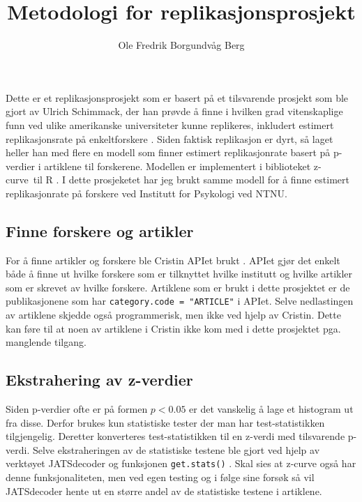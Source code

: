 \documentclass[doc,norsk]{apa7}
\title{Metodologi for replikasjonsprosjekt}
\author{Ole Fredrik Borgundvåg Berg}
\affiliation{NTNU}
\begin{document}
\maketitle

Dette er et replikasjonsprosjekt som er basert på et tilsvarende prosjekt som ble gjort av Ulrich Schimmack, der han prøvde å finne i hvilken grad vitenskaplige funn ved ulike amerikanske universiteter kunne replikeres, inkludert estimert replikasjonsrate på enkeltforskere \parencite{amerikansk-ranking}. Siden faktisk replikasjon er dyrt, så laget heller han med flere en modell som finner estimert replikasjonrate basert på p-verdier i artiklene til forskerene. Modellen er implementert i biblioteket \guillemetleft z-curve\guillemetright\ til R \parencite{z-curve-modell, z-curve-implementasjon}. I dette prosjeketet har jeg brukt samme modell for å finne estimert replikasjonrate på forskere ved Institutt for Psykologi ved NTNU.

\subsection{Finne forskere og artikler}
For å finne artikler og forskere ble Cristin APIet brukt \parencite{cristin-api}. APIet gjør det enkelt både å finne ut hvilke forskere som er tilknyttet hvilke institutt og hvilke artikler som er skrevet av hvilke forskere. Artiklene som er brukt i dette prosjektet er de publikasjonene som har \texttt{category.code = "ARTICLE"} i APIet. Selve nedlastingen av artiklene skjedde også programmerisk, men ikke ved hjelp av Cristin. Dette kan føre til at noen av artiklene i Cristin ikke kom med i dette prosjektet pga. manglende tilgang.

\subsection{Ekstrahering av z-verdier}
Siden p-verdier ofte er på formen $p < 0.05$ er det vanskelig å lage et histogram ut fra disse. Derfor brukes kun statistiske tester der man har test-statistikken tilgjengelig. Deretter konverteres test-statistikken til en z-verdi med tilsvarende p-verdi. Selve ekstraheringen av de statistiske testene ble gjort ved hjelp av verktøyet JATSdecoder og funksjonen \texttt{get.stats()} \parencite{jatsdecoder}. Skal sies at z-curve også har denne funksjonaliteten, men ved egen testing og i følge \textcite{jatsdecoder} sine forsøk så vil JATSdecoder hente ut en større andel av de statistiske testene i artiklene.
\end{document}
